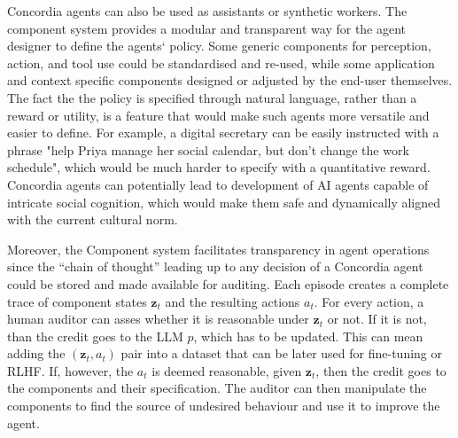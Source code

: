 \documentclass[11pt, a4paper, logo, twocolumn, internal, copyright, numbering]{googledeepmind}
\begin{document}
Concordia agents can also be used as assistants or synthetic workers. The component system provides a modular and transparent way for the agent designer to define the agents` policy. Some generic components for perception, action, and tool use could be standardised and re-used, while some application and context specific components designed or adjusted by the end-user themselves. The fact the the policy is specified through  natural language, rather than a reward or utility, is a feature that would make such agents more versatile and easier to define. For example, a digital secretary can be easily instructed with a phrase "help Priya manage her social calendar, but don't change the work schedule", which would be much harder to specify with a quantitative reward. Concordia agents can potentially lead to development of AI agents capable of intricate social cognition, which would make them safe and dynamically aligned with the current cultural norm.

Moreover, the Component system facilitates transparency in agent operations since the  ``chain of thought'' leading up to any decision of a Concordia agent could be stored and made available for auditing. Each episode creates a complete trace of component states $\mathbf{z}_t$ and the resulting actions $a_t$. For every action, a human auditor can asses whether it is reasonable under $\mathbf{z}_t$ or not. If it is not, than the credit goes to the LLM $p$, which has to be updated. This can mean adding the $(\mathbf{z}_t, a_t)$ pair into a dataset that can be later used for fine-tuning or RLHF. If, however, the $a_t$ is deemed reasonable, given $\mathbf{z}_t$, then the credit goes to the components and their specification. The auditor can then manipulate the components to find the source of undesired behaviour and use it to improve the agent. 
\end{document}

